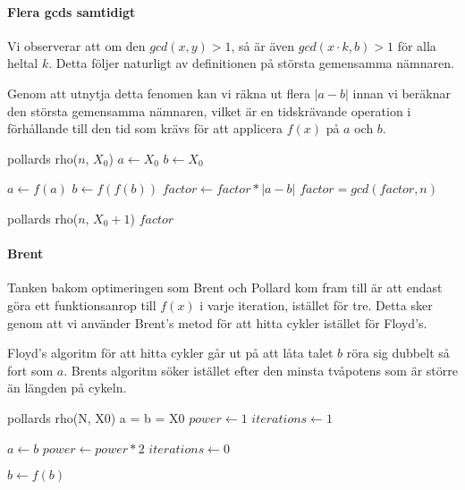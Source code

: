 \documentclass[a4paper,12pt]{article}
\renewcommand{\*}{\ensuremath{\cdot}}
\begin{document}
\paragraph{Flera gcds samtidigt}

Vi observerar att om den $gcd(x, y) > 1$, så är även $gcd(x\cdot k, b)>1$ för alla heltal $k$. Detta följer naturligt av definitionen på största gemensamma nämnaren.

Genom att utnytja detta fenomen kan vi räkna ut flera $|a-b|$ innan vi beräknar den största gemensamma nämnaren, vilket är en tidskrävande operation i förhållande till den tid som krävs för att applicera $f(x)$ på $a$ och $b$.

\begin{algorithmic}
    \STATE pollards rho($n$, $X_0$)
        \STATE $a \gets X_0 $
        \STATE $b \gets X_0 $

                \STATE $a \gets f(a)$
                \STATE $b \gets f(f(b))$
                \STATE $factor \gets factor * |a-b|$
            \ENDFOR
            \STATE $factor = gcd(factor, n)$
        \ENDWHILE

            \STATE {}
            \RETURN pollards rho($n$, $X_0+1$) 
            \RETURN $factor$
        \ENDIF
\end{algorithmic}

\paragraph{Brent}

Tanken bakom optimeringen som Brent och Pollard kom fram till är att endast göra ett funktionsanrop till $f(x)$ i varje iteration, istället för tre. Detta sker genom att vi använder Brent's metod för att hitta cykler istället för Floyd's. 

Floyd's algoritm för att hitta cykler går ut på att låta talet $b$ röra sig dubbelt så fort som $a$. Brents algoritm söker istället efter den minsta tvåpotens som är större än längden på cykeln.

pollards rho(N, X0)
    a = b = X0
    \STATE $power \gets 1$
    \STATE $iterations \gets 1$

        \STATE $a \gets b$
        \STATE $power \gets power *2$
        \STATE $iterations \gets 0$
    
    \STATE $b \gets f(b)$
\end{document}
